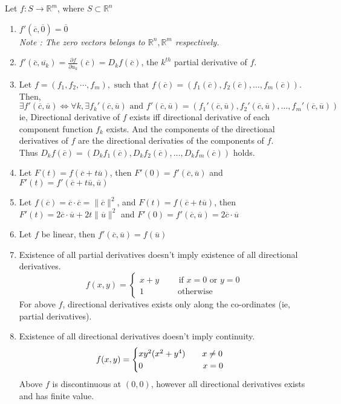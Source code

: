 \begin{remark}[Properties] Let \(f : S \to \mathbb{R}^m \), where \( S \subset \mathbb{R}^n\)
	\begin{enumerate}
		\item \( f'(\overline{c},\overline{0}) = \overline{0} \)\\
			\textsl{Note : The zero vectors belongs to $\mathbb{R}^n, \mathbb{R}^m$ respectively.}
		\item \( f'(\overline{c},\overline{u_k}) = \frac{\partial f}{\partial u_k}(\overline{c}) = D_k f(\overline{c}) \), the $k^{th}$ partial derivative of $f$.
		\item Let \( f = (f_1, f_2, \cdots, f_m), \text{ such that } f(\overline{c}) = \left(f_1(\overline{c}),f_2(\overline{c}),\dotsc,f_m(\overline{c})\right) \).
			Then, 
			\[ \exists f'(\overline{c},\overline{u}) \iff \forall k, \exists f_k'(\overline{c},\overline{u}) \text{ and } f'(\overline{c},\overline{u}) = \left(f_1'(\overline{c},\overline{u}),f_2'(\overline{c},\overline{u}),\dotsc,f_m'(\overline{c},\overline{u})\right) \]
			ie, Directional derivative of $f$ exists iff directional derivative of each component function $f_k$ exists.
			And the components of the directional derivatives of $f$ are the directional derivaties of the components of $f$.\\
			Thus \( D_k f(\overline{c}) = \left(D_k f_1(\overline{c}),D_k f_2(\overline{c}),\dotsc,D_k f_m(\overline{c}) \right) \) holds.
		\item Let \( F(t) = f(\overline{c}+t\overline{u}) \), then \( F'(0) = f'(\overline{c},\overline{u}) \) and \( F'(t) = f'(\overline{c}+t\overline{u},\overline{u}) \)
		\item Let \( f(\overline{c}) = \overline{c}\cdot\overline{c} = \|\overline{c}\|^2 \), and \(F(t) = f(\overline{c}+t\overline{u}) \), then \( F'(t) = 2\overline{c}\cdot\overline{u}+2t\|\overline{u}\|^2 \) and \( F'(0) = f'(\overline{c},\overline{u}) = 2\overline{c}\cdot\overline{u} \)
		\item Let \(f\) be linear, then \( f'(\overline{c},\overline{u}) = f(\overline{u}) \)
		\item Existence of all partial derivatives doesn't imply existence of all directional derivatives.
			\[ f(x,y) = \begin{cases} x+y \qquad \text{ if } x = 0 \text{ or } y = 0 \\ 1 \qquad \qquad \text{otherwise} \end{cases} \]
			For above \(f\), directional derivatives exists only along the co\nobreakdash-ordinates (ie, partial derivatives).
		\item Existence of all directional derivatives doesn't imply continuity.
			\[ f(x,y) = \begin{cases} xy^2(x^2+y^4) \qquad x \ne 0 \\ 0 \hspace{2.5cm} x = 0 \end{cases} \]
				Above \(f\) is discontinuous at \((0,0)\), however all directional derivatives exists and has finite value.
	\end{enumerate}
\end{remark}

